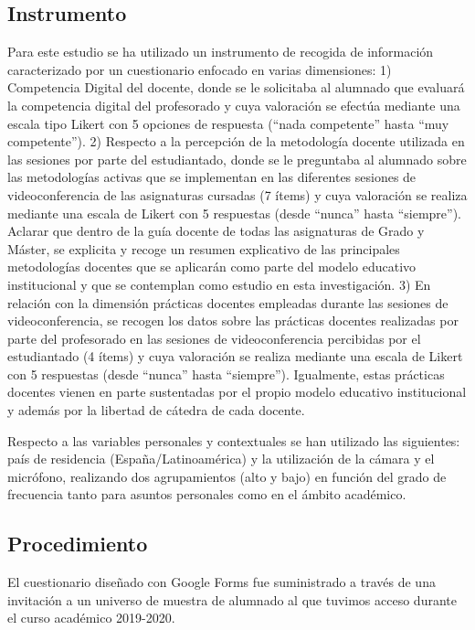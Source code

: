 \documentclass[spanish]{textolivre}
\begin{document}
\subsection{Instrumento}\label{sec-instrumento}
Para este estudio se ha utilizado un instrumento de recogida de información caracterizado por un cuestionario enfocado en varias dimensiones: 1) Competencia Digital del docente, donde se le solicitaba al alumnado que evaluará la competencia digital del profesorado y cuya valoración se efectúa mediante una escala tipo Likert con 5 opciones de respuesta (“nada competente” hasta “muy competente”). 2) Respecto a la percepción de la metodología docente utilizada en las sesiones por parte del estudiantado, donde se le preguntaba al alumnado sobre las metodologías activas que se implementan en las diferentes sesiones de videoconferencia de las asignaturas cursadas (7 ítems) y cuya valoración se realiza mediante una escala de Likert con 5 respuestas (desde “nunca” hasta “siempre”). Aclarar que dentro de la guía docente de todas las asignaturas de Grado y Máster, se explicita y recoge un resumen explicativo de las principales metodologías docentes que se aplicarán como parte del modelo educativo institucional y que se contemplan como estudio en esta investigación. 3) En relación con la dimensión prácticas docentes empleadas durante las sesiones de videoconferencia, se recogen los datos sobre las prácticas docentes realizadas por parte del profesorado en las sesiones de videoconferencia percibidas por el estudiantado (4 ítems) y cuya valoración se realiza mediante una escala de Likert con 5 respuestas (desde “nunca” hasta “siempre”). Igualmente, estas prácticas docentes vienen en parte sustentadas por el propio modelo educativo institucional y además por la libertad de cátedra de cada docente.

Respecto a las variables personales y contextuales se han utilizado las siguientes: país de residencia (España/Latinoamérica) y la utilización de la cámara y el micrófono, realizando dos agrupamientos (alto y bajo) en función del grado de frecuencia tanto para asuntos personales como en el ámbito académico.

\subsection{Procedimiento}\label{sec-procedimiento}
El cuestionario diseñado con Google Forms fue suministrado a través de una invitación a un universo de muestra de alumnado al que tuvimos acceso durante el curso académico 2019-2020.
\end{document}
